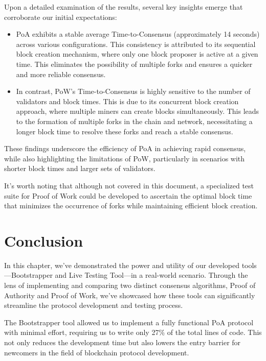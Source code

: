 Upon a detailed examination of the results, several key insights emerge that corroborate our initial expectations:

\begin{itemize}
    \item PoA exhibits a stable average Time-to-Consensus (approximately 14 seconds) across various configurations. This consistency is attributed to its sequential block creation mechanism, where only one block proposer is active at a given time. This eliminates the possibility of multiple forks and ensures a quicker and more reliable consensus. 
    
    \item In contrast, PoW's Time-to-Consensus is highly sensitive to the number of validators and block times. This is due to its concurrent block creation approach, where multiple miners can create blocks simultaneously. This leads to the formation of multiple forks in the chain and network, necessitating a longer block time to resolve these forks and reach a stable consensus.
\end{itemize}

These findings underscore the efficiency of PoA in achieving rapid consensus, while also highlighting the limitations of PoW, particularly in scenarios with shorter block times and larger sets of validators.

It's worth noting that although not covered in this document, a specialized test suite for Proof of Work could be developed to ascertain the optimal block time that minimizes the occurrence of forks while maintaining efficient block creation.


\section{Conclusion}

In this chapter, we've demonstrated the power and utility of our developed tools—Bootstrapper and Live Testing Tool—in a real-world scenario. Through the lens of implementing and comparing two distinct consensus algorithms, Proof of Authority and Proof of Work, we've showcased how these tools can significantly streamline the protocol development and testing process.

The Bootstrapper tool allowed us to implement a fully functional PoA protocol with minimal effort, requiring us to write only 27\% of the total lines of code. This not only reduces the development time but also lowers the entry barrier for newcomers in the field of blockchain protocol development.

